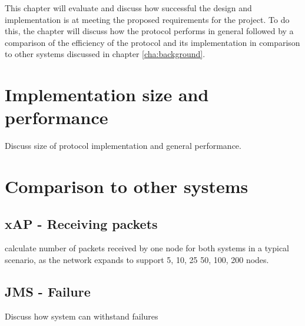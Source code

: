 This chapter will evaluate and discuss how successful the design and implementation is at meeting the proposed requirements for the project. To do this, the chapter will discuss how the protocol performs in general followed by a comparison of the efficiency of the protocol and its implementation in comparison to other systems discussed in chapter \ref{cha:background}.

\section{Implementation size and performance} %
\label{sec:implementation_size_and_performance}
Discuss size of protocol implementation and general performance.

\section{Comparison to other systems} %
\label{sec:comparison_to_other_systems}

\subsection{xAP - Receiving packets} %
\label{sub:xap}
calculate number of packets received by one node for both systems in a typical scenario, as the network expands to support 5, 10, 25 50, 100, 200 nodes.


\subsection{JMS - Failure} %
\label{sub:jms_failure}
Discuss how system can withstand failures



